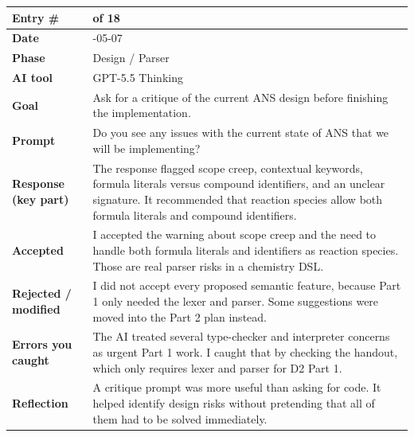 \documentclass[11pt,a4paper]{article}
\newcommand{\code}[1]{\texttt{\detokenize{#1}}}
\newcommand{\entrygap}{\vspace{8pt}}
\newenvironment{journalentry}{%
  \begin{center}\small\renewcommand{\arraystretch}{1.22}%
  \begin{tabular}{|>{\columncolor{anscodebg}\bfseries}p{3.0cm}|>{\RaggedRight\arraybackslash}p{12.25cm}|}%
  \hline
}{%
  \end{tabular}\end{center}\entrygap
}
\begin{document}
\begin{journalentry}
Entry \# & 8 of 18 \\ \hline
Date & 2026-05-07 \\ \hline
Phase & Design / Parser \\ \hline
AI tool & GPT-5.5 Thinking \\ \hline
Goal & Ask for a critique of the current ANS design before finishing the implementation. \\ \hline
Prompt & Do you see any issues with the current state of ANS that we will be implementing? \\ \hline
Response (key part) & The response flagged scope creep, contextual keywords, formula literals versus compound identifiers, and an unclear \code{compute\_yield} signature. It recommended that reaction species allow both formula literals and compound identifiers. \\ \hline
Accepted & I accepted the warning about scope creep and the need to handle both formula literals and identifiers as reaction species. Those are real parser risks in a chemistry DSL. \\ \hline
Rejected / modified & I did not accept every proposed semantic feature, because Part 1 only needed the lexer and parser. Some suggestions were moved into the Part 2 plan instead. \\ \hline
Errors you caught & The AI treated several type-checker and interpreter concerns as urgent Part 1 work. I caught that by checking the handout, which only requires lexer and parser for D2 Part 1. \\ \hline
Reflection & A critique prompt was more useful than asking for code. It helped identify design risks without pretending that all of them had to be solved immediately. \\ \hline
\end{journalentry}
\end{document}
